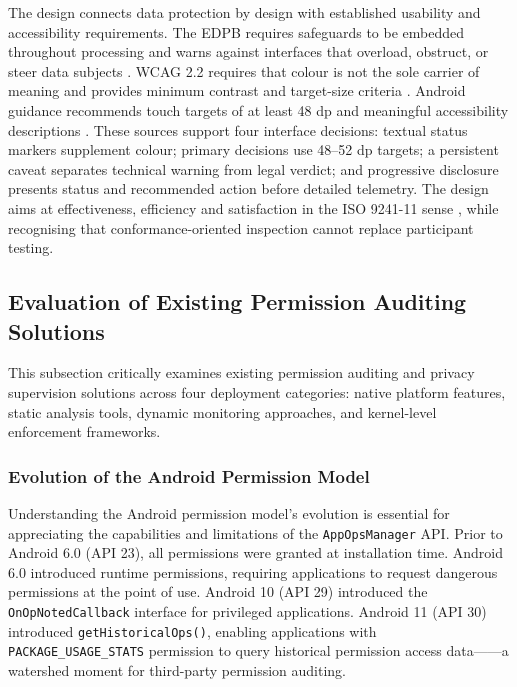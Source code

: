 The design connects data protection by design with established usability and accessibility requirements. The EDPB requires safeguards to be embedded throughout processing and warns against interfaces that overload, obstruct, or steer data subjects \cite{edpb2019,edpb2022}. WCAG 2.2 requires that colour is not the sole carrier of meaning and provides minimum contrast and target-size criteria \cite{wcag22}. Android guidance recommends touch targets of at least 48 dp and meaningful accessibility descriptions \cite{androidaccess}. These sources support four interface decisions: textual status markers supplement colour; primary decisions use 48--52 dp targets; a persistent caveat separates technical warning from legal verdict; and progressive disclosure presents status and recommended action before detailed telemetry. The design aims at effectiveness, efficiency and satisfaction in the ISO 9241-11 sense \cite{iso924111}, while recognising that conformance-oriented inspection cannot replace participant testing.

\subsection{Evaluation of Existing Permission Auditing Solutions}

This subsection critically examines existing permission auditing and privacy supervision solutions across four deployment categories: native platform features, static analysis tools, dynamic monitoring approaches, and kernel-level enforcement frameworks.

\subsubsection{Evolution of the Android Permission Model}

Understanding the Android permission model's evolution is essential for appreciating the capabilities and limitations of the \texttt{AppOpsManager} API. Prior to Android 6.0 (API 23), all permissions were granted at installation time. Android 6.0 introduced runtime permissions, requiring applications to request dangerous permissions at the point of use. Android 10 (API 29) introduced the \texttt{OnOpNotedCallback} interface for privileged applications. Android 11 (API 30) introduced \texttt{getHistoricalOps()}, enabling applications with \texttt{PACKAGE\_USAGE\_STATS} permission to query historical permission access data——a watershed moment for third-party permission auditing.


